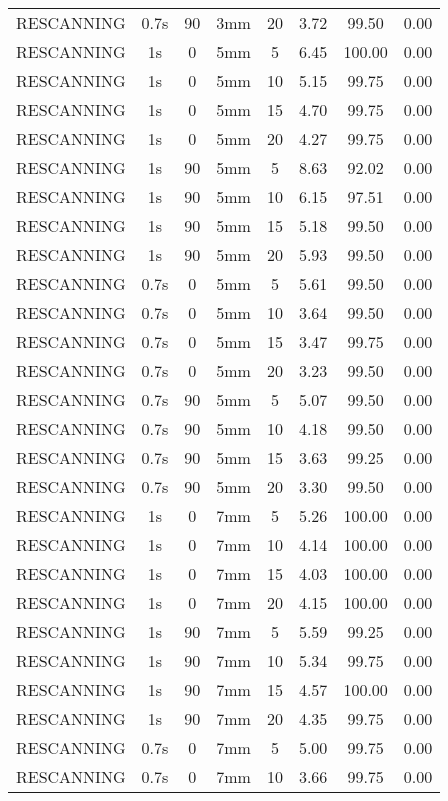 \begin{table}[H]
\begin{tabular}{|c||c|c|c|c||c|c|c|}
RESCANNING & 0.7s & 90 & 3mm & 20 & 3.72 & 99.50 & 0.00 \\
RESCANNING & 1s & 0 & 5mm & 5 & 6.45 & 100.00 & 0.00 \\
RESCANNING & 1s & 0 & 5mm & 10 & 5.15 & 99.75 & 0.00 \\
RESCANNING & 1s & 0 & 5mm & 15 & 4.70 & 99.75 & 0.00 \\
RESCANNING & 1s & 0 & 5mm & 20 & 4.27 & 99.75 & 0.00 \\
RESCANNING & 1s & 90 & 5mm & 5 & 8.63 & 92.02 & 0.00 \\
RESCANNING & 1s & 90 & 5mm & 10 & 6.15 & 97.51 & 0.00 \\
RESCANNING & 1s & 90 & 5mm & 15 & 5.18 & 99.50 & 0.00 \\
RESCANNING & 1s & 90 & 5mm & 20 & 5.93 & 99.50 & 0.00 \\
RESCANNING & 0.7s & 0 & 5mm & 5 & 5.61 & 99.50 & 0.00 \\
RESCANNING & 0.7s & 0 & 5mm & 10 & 3.64 & 99.50 & 0.00 \\
RESCANNING & 0.7s & 0 & 5mm & 15 & 3.47 & 99.75 & 0.00 \\
RESCANNING & 0.7s & 0 & 5mm & 20 & 3.23 & 99.50 & 0.00 \\
RESCANNING & 0.7s & 90 & 5mm & 5 & 5.07 & 99.50 & 0.00 \\
RESCANNING & 0.7s & 90 & 5mm & 10 & 4.18 & 99.50 & 0.00 \\
RESCANNING & 0.7s & 90 & 5mm & 15 & 3.63 & 99.25 & 0.00 \\
RESCANNING & 0.7s & 90 & 5mm & 20 & 3.30 & 99.50 & 0.00 \\
RESCANNING & 1s & 0 & 7mm & 5 & 5.26 & 100.00 & 0.00 \\
RESCANNING & 1s & 0 & 7mm & 10 & 4.14 & 100.00 & 0.00 \\
RESCANNING & 1s & 0 & 7mm & 15 & 4.03 & 100.00 & 0.00 \\
RESCANNING & 1s & 0 & 7mm & 20 & 4.15 & 100.00 & 0.00 \\
RESCANNING & 1s & 90 & 7mm & 5 & 5.59 & 99.25 & 0.00 \\
RESCANNING & 1s & 90 & 7mm & 10 & 5.34 & 99.75 & 0.00 \\
RESCANNING & 1s & 90 & 7mm & 15 & 4.57 & 100.00 & 0.00 \\
RESCANNING & 1s & 90 & 7mm & 20 & 4.35 & 99.75 & 0.00 \\
RESCANNING & 0.7s & 0 & 7mm & 5 & 5.00 & 99.75 & 0.00 \\
RESCANNING & 0.7s & 0 & 7mm & 10 & 3.66 & 99.75 & 0.00 \\

\end{tabular}
\end{table}
